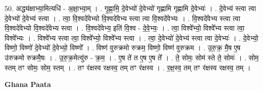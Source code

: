 \documentclass[17pt]{extarticle}
\begin{document}
50. अद्ध्य॑क्षाभ्या॒मित्यधि॑ - अ॒क्षा॒भ्या॒म् । . गृ॒ह्णा॒मि॒ दे॒वेभ्यो॑ दे॒वेभ्यो॑ गृह्णामि गृह्णामि दे॒वेभ्यः॑ । . दे॒वेभ्य॑ स्त्वा त्वा दे॒वेभ्यो॑ दे॒वेभ्य॑ स्त्वा । . त्वा॒ वि॒श्वदे॑वेभ्यो वि॒श्वदे॑वेभ्य स्त्वा त्वा वि॒श्वदे॑वेभ्यः । . वि॒श्वदे॑वेभ्य स्त्वा त्वा वि॒श्वदे॑वेभ्यो वि॒श्वदे॑वेभ्य स्त्वा । . वि॒श्वदे॑वेभ्य॒ इति॑ वि॒श्व - दे॒वे॒भ्यः॒ । . त्वा॒ विश्वे᳚भ्यो॒ विश्वे᳚भ्य स्त्वा त्वा॒ विश्वे᳚भ्यः । . विश्वे᳚भ्य स्त्वा त्वा॒ विश्वे᳚भ्यो॒ विश्वे᳚भ्य स्त्वा । . त्वा॒ दे॒वेभ्यो॑ दे॒वेभ्य॑ स्त्वा त्वा दे॒वेभ्यः॑ । . दे॒वेभ्यो॒ विष्णो॒ विष्णो॑ दे॒वेभ्यो॑ दे॒वेभ्यो॒ विष्णो᳚ । . विष्ण॑ वुरुक्रमो रुक्रम॒ विष्णो॒ विष्ण॑ वुरुक्रम । . उ॒रु॒क्र॒ मै॒ष ए॒ष उ॑रुक्रमो रुक्रमै॒षः । . उ॒रु॒क्र॒मेत्यु॑रु - क्र॒म॒ । . ए॒ष ते॑ त ए॒ष ए॒ष ते᳚ । . ते॒ सोमः॒ सोम॑ स्ते ते॒ सोमः॑ । . सोम॒ स्तम् तꣳ सोमः॒ सोम॒ स्तम् । . तꣳ र॑क्षस्व रक्षस्व॒ तम् तꣳ र॑क्षस्व । . र॒क्ष॒स्व॒ तम् तꣳ र॑क्षस्व रक्षस्व॒ तम् । \newline

\textbf{Ghana Paata } \newline
\end{document}
